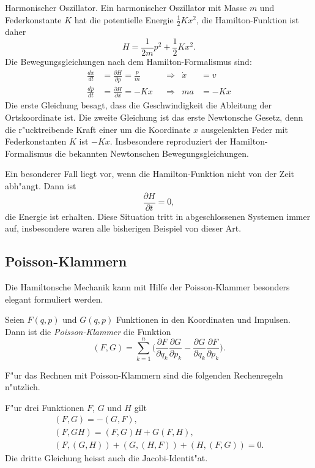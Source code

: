 \begin{beispiel} Harmonischer Oszillator. Ein harmonischer Oszillator
mit Masse $m$ und Federkonstante $K$ hat die potentielle Energie $\frac12Kx^2$,
die Hamilton-Funktion ist daher
\[
H=\frac1{2m}p^2+\frac12Kx^2.
\]
Die Bewegungsgleichungen nach dem Hamilton-Formalismus sind:
\begin{align*}
\frac{dx}{dt}&=\frac{\partial H}{\partial p}=\frac{p}{m}&&\Rightarrow&\dot x&=v\\
\frac{dp}{dt}&=\frac{\partial H}{\partial x}=-Kx&&\Rightarrow&ma&=-Kx
\end{align*}
Die erste Gleichung besagt, dass die Geschwindigkeit die Ableitung
der Ortskoordinate ist.
Die zweite Gleichung ist das erste Newtonsche Gesetz, denn die
r"ucktreibende Kraft einer um die Koordinate $x$ ausgelenkten Feder
mit Federkonstanten $K$ ist $-Kx$.
Insbesondere reproduziert der Hamilton-Formalismus die bekannten
Newtonschen Bewegungsgleichungen.
\end{beispiel}

Ein besonderer Fall liegt vor, wenn die Hamilton-Funktion nicht von
der Zeit abh"angt. Dann ist
\[
\frac{\partial H}{\partial t}=0,
\]
die Energie ist erhalten. Diese Situation tritt in abgeschlossenen
Systemen immer auf, insbesondere waren alle bisherigen Beispiel
von dieser Art.

\subsection{Poisson-Klammern}
Die Hamiltonsche Mechanik kann mit Hilfe der Poisson-Klammer besonders
elegant formuliert werden.

\begin{definition}
Seien $F(q,p)$ und $G(q,p)$ Funktionen in den Koordinaten und Impulsen. 
Dann ist die {\em Poisson-Klammer} die Funktion
\[
(F,G)
=
\sum_{k=1}^n
\biggl(
\frac{\partial F}{\partial q_k}\frac{\partial G}{\partial p_k}
-
\frac{\partial G}{\partial q_k}\frac{\partial F}{\partial p_k}
\biggr).
\]
\end{definition}

F"ur das Rechnen mit Poisson-Klammern sind die folgenden Rechenregeln
n"utzlich.
\begin{satz}
F"ur drei Funktionen $F$, $G$ und $H$ gilt
\begin{gather}
(F,G)=-(G,F),
\label{skript:poisson-antisymmetrie}
\\
(F,GH)
=
(F,G)H+G(F,H),
\label{skript:poisson-derivation}
\\
(F,(G,H))
+
(G,(H,F))
+
(H,(F,G))
=0.
\label{skript:poisson-jacobi}
\end{gather}
Die dritte Gleichung heisst auch die Jacobi-Identit"at.
\end{satz}

